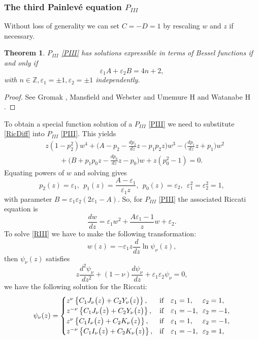 \documentclass[12pt]{article}
\def\P{Painlev\'e }
\def\Z{\mathbb{Z}}
\newtheorem{mydef}{Theorem}[section]
\numberwithin{figure}{section}
\numberwithin{equation}{section}
\numberwithin{table}{section}
\begin{document}
\subsubsection{The third \P equation $P_{III}$}
Without loss of generality we can set $C=-D=1$  by rescaling $w$ and $z$ if necessary.
\begin{mydef}
$P_{III}$ \eqref{PIII} has solutions expressible in terms of Bessel functions if and only if
$$\varepsilon_1A+\varepsilon_2B=4n+2,$$
with $n\in\Z, \varepsilon_1=\pm1, \varepsilon_2=\pm1$ independently.
\end{mydef}
\begin{proof}
See Gromak \cite{P:14:1510}, Mansfield and Webster \cite{P:101:321} and Umemure H and Watanabe H \cite{P:151:1}.
\end{proof}
To obtain a special function solution of a $P_{III}$ \eqref{PIII} we need to substitute \eqref{RicDiff} into $P_{III}$ \eqref{PIII}. This yields
\begin{align*}
&z(1-p_2^2)w^4+\bigg(A-p_2-\frac{dp_2}{dz}z-p_1p_2z\bigg)w^3-\bigg(\frac{dp_1}{dz}z+p_1\bigg)w^2
\\&\qquad+\bigg(B+p_1p_0z-\frac{dp_0}{dz}z-p_0\bigg)w+z(p_0^2-1)=0.
\end{align*}
Equating powers of $w$ and solving gives
$$p_2(z)=\varepsilon_1,~~p_1(z)=\frac{A-\varepsilon_1}{\varepsilon_1z},~~p_0(z)=\varepsilon_2,~~\varepsilon_1^2=\varepsilon_2^2=1,$$
with parameter $B=\varepsilon_1\varepsilon_2(2\varepsilon_1-A)$.
So, for $P_{III}$ \eqref{PIII} the associated Riccati equation is
\begin{equation}
\frac{dw}{dz}=\varepsilon_1w^2+\frac{A\varepsilon_1-1}{z} w+\varepsilon_2.\label{RIII}
\end{equation}
To solve \eqref{RIII} we have to make the following transformation:
$$w(z)=-\varepsilon_1z\frac{d}{dz}\ln\psi_\nu(z),$$
then $\psi_\nu(z)$ satisfies
\begin{equation}
z\frac{d^2\psi_\nu}{dz^2}+(1-\nu)\frac{d\psi_\nu}{dz}+\varepsilon_1\varepsilon_2\psi_\nu=0,
\end{equation}
we have the following solution for the Riccati:
$$\psi_{\nu}(z)=\begin{cases}
z^{\nu}\left\{C_1J_{\nu}\big(z\big)+C_2Y_{\nu}\big(z\big)\right\},&\mbox{\rm if}\quad \varepsilon_1=1,\phantom{-}\enskip\varepsilon_2=1,\\
z^{-\nu}\left\{C_1J_{\nu}\big(z\big)+C_2Y_{\nu}\big(z\big)\right\},&\mbox{\rm if}\quad \varepsilon_1=-1,\enskip\varepsilon_2=-1,\\
z^{\nu}\left\{C_1I_{\nu}\big(z\big)+C_2K_{\nu}\big(z\big)\right\},&\mbox{\rm if}\quad\varepsilon_1=1,\phantom{-}\enskip\varepsilon_2=-1,\\
z^{-\nu}\left\{C_1I_{\nu}\big(z\big)+C_2K_{\nu}\big(z\big)\right\},&\mbox{\rm if}\quad\varepsilon_1=-1,\enskip\varepsilon_2=1,
\end{cases}
$$
\end{document}
